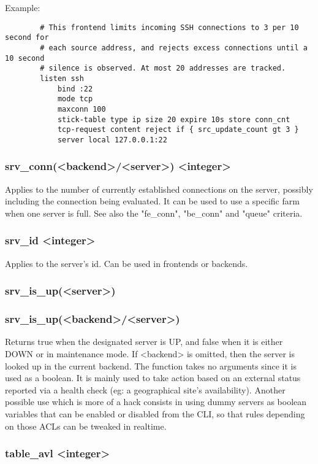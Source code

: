   Example:
  \begin{verbatim}
        # This frontend limits incoming SSH connections to 3 per 10 second for
        # each source address, and rejects excess connections until a 10 second
        # silence is observed. At most 20 addresses are tracked.
        listen ssh
            bind :22
            mode tcp
            maxconn 100
            stick-table type ip size 20 expire 10s store conn_cnt
            tcp-request content reject if { src_update_count gt 3 }
            server local 127.0.0.1:22
  \end{verbatim}

\subsubsection[srv\_conn]{srv\_conn(<backend>/<server>) <integer>}
  Applies to the number of currently established connections on the server,
  possibly including the connection being evaluated.
  It can be used to use a specific farm when one server is full.
  See also the "fe\_conn", "be\_conn" and "queue" criteria.

\subsubsection[srv\_id]{srv\_id <integer>}
  Applies to the server's id. Can be used in frontends or backends.

\subsubsection[srv\_is\_up]{srv\_is\_up(<server>)}
\subsubsection*{srv\_is\_up(<backend>/<server>)}
  Returns true when the designated server is UP, and false when it is either
  DOWN or in maintenance mode. If <backend> is omitted, then the server is
  looked up in the current backend. The function takes no arguments since it
  is used as a boolean. It is mainly used to take action based on an external
  status reported via a health check (eg: a geographical site's availability).
  Another possible use which is more of a hack consists in using dummy servers
  as boolean variables that can be enabled or disabled from the CLI, so that
  rules depending on those ACLs can be tweaked in realtime.

\subsubsection[table\_avl]{table\_avl <integer>}
